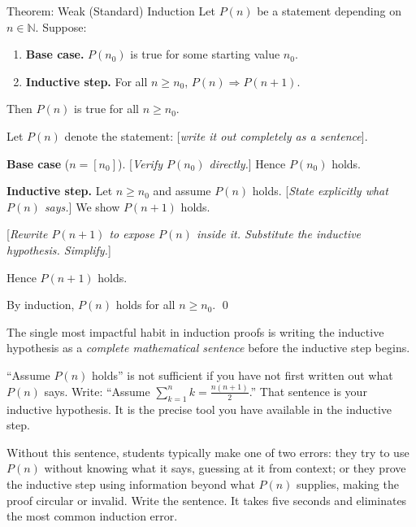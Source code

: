 \begin{propositionbox}{Theorem: Weak (Standard) Induction}
Let $P(n)$ be a statement depending on $n \in \mathbb{N}$. Suppose:
\begin{enumerate}[itemsep=2pt]
  \item \textbf{Base case.} $P(n_0)$ is true for some starting value $n_0$.
  \item \textbf{Inductive step.} For all $n \geq n_0$,
    $P(n) \Rightarrow P(n+1)$.
\end{enumerate}
Then $P(n)$ is true for all $n \geq n_0$.
\end{propositionbox}

\begin{tcolorbox}[colback=gray!4, colframe=gray!35, arc=2pt,
  left=6pt, right=6pt, top=4pt, bottom=4pt,
  title={\small\textbf{Template: Weak Induction Proof}},
  fonttitle=\small\bfseries]
Let $P(n)$ denote the statement: [\emph{write it out completely as a sentence}].

\medskip
\noindent\textbf{Base case} ($n = [n_0]$).
[\emph{Verify $P(n_0)$ directly.}]
Hence $P(n_0)$ holds.

\medskip
\noindent\textbf{Inductive step.}
Let $n \geq n_0$ and assume $P(n)$ holds. [\emph{State explicitly
what $P(n)$ says.}]
We show $P(n+1)$ holds.

[\emph{Rewrite $P(n+1)$ to expose $P(n)$ inside it.
Substitute the inductive hypothesis. Simplify.}]

Hence $P(n+1)$ holds.

\medskip
\noindent By induction, $P(n)$ holds for all $n \geq n_0$. \qed
\end{tcolorbox}

\begin{remark}
The single most impactful habit in induction proofs is writing the
inductive hypothesis as a \emph{complete mathematical sentence}
before the inductive step begins.

``Assume $P(n)$ holds'' is not sufficient if you have not first written
out what $P(n)$ says. Write: ``Assume
$\sum_{k=1}^n k = \frac{n(n+1)}{2}$.'' That sentence is your
inductive hypothesis. It is the precise tool you have available in
the inductive step.

Without this sentence, students typically make one of two errors:
they try to use $P(n)$ without knowing what it says, guessing at it
from context; or they prove the inductive step using information
beyond what $P(n)$ supplies, making the proof circular or invalid.
Write the sentence. It takes five seconds and eliminates the
most common induction error.
\end{remark}


